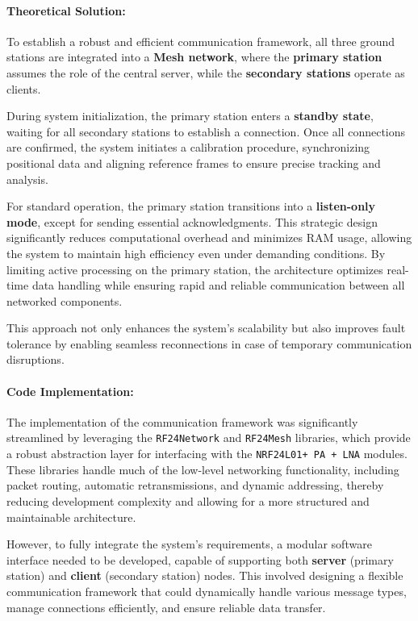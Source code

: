 \paragraph{Theoretical Solution:}  
To establish a robust and efficient communication framework, all three ground stations are integrated into a \textbf{Mesh network}, where the \textbf{primary station} assumes the role of the central server, while the \textbf{secondary stations} operate as clients.

During system initialization, the primary station enters a \textbf{standby state}, waiting for all secondary stations to establish a connection. Once all connections are confirmed, the system initiates a calibration procedure, synchronizing positional data and aligning reference frames to ensure precise tracking and analysis.  

For standard operation, the primary station transitions into a \textbf{listen-only mode}, except for sending essential acknowledgments. This strategic design significantly reduces computational overhead and minimizes RAM usage, allowing the system to maintain high efficiency even under demanding conditions. By limiting active processing on the primary station, the architecture optimizes real-time data handling while ensuring rapid and reliable communication between all networked components.  

This approach not only enhances the system's scalability but also improves fault tolerance by enabling seamless reconnections in case of temporary communication disruptions.  

\paragraph{Code Implementation:}  
The implementation of the communication framework was significantly streamlined by leveraging the \texttt{RF24Network} and \texttt{RF24Mesh} libraries, which provide a robust abstraction layer for interfacing with the \texttt{NRF24L01+ PA + LNA} modules. These libraries handle much of the low-level networking functionality, including packet routing, automatic retransmissions, and dynamic addressing, thereby reducing development complexity and allowing for a more structured and maintainable architecture.  

However, to fully integrate the system’s requirements, a modular software interface needed to be developed, capable of supporting both \textbf{server} (primary station) and \textbf{client} (secondary station) nodes. This involved designing a flexible communication framework that could dynamically handle various message types, manage connections efficiently, and ensure reliable data transfer.  

